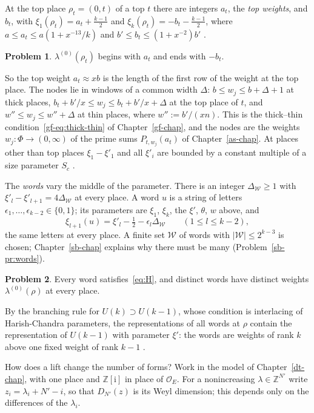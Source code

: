 \documentclass[reqno]{amsart}
\newcounter{chap}
\theoremstyle{definition}
\newtheorem{problem}{Problem}[section]
\theoremstyle{plain}
\theoremstyle{remark}
\newcommand{\Z}{\mathbb Z}
\newcommand{\Oc}{\mathcal O}
\newcommand{\Wc}{\mathcal W}
\begin{document}
At the top place \(\rho_t=(0,t)\) of a top \(t\) there are integers \(a_t\), the \emph{top weights}, and \(b_t\), with \(\xi_1(\rho_t)=a_t+\frac{k-1}2\) and \(\xi_k(\rho_t)=-b_t-\frac{k-1}2\), where \(a\le a_t\le a(1+x^{-13}/k)\) and \(b'\le b_t\le(1+x^{-2})b'\) \cite[Def.~18.5]{Adr}.

\begin{problem}\label{pr:top}
\(\lambda^{(0)}(\rho_t)\) begins with \(a_t\) and ends with \(-b_t\).
\end{problem}

So the top weight \(a_t\approx xb\) is the length of the first row of the weight at the top place.  The nodes lie in windows of a common width \(\Delta\): \(b\le w_j\le b+\Delta+1\) at thick places, \(b_t+b'/x\le w_j\le b_t+b'/x+\Delta\) at the top place of \(t\), and \(w''\le w_j\le w''+\Delta\) at thin places, where \(w'':=b'/(xn)\).  This is the thick--thin condition~\eqref{gf-eq:thick-thin} of Chapter~\ref{gf-chap}, and the nodes are the weights \(w_j\colon\Phi\to(0,\infty)\) of the prime sums \(P_{t,w_j}(a_t)\) of Chapter~\ref{as-chap}.  At places other than top places \(\xi_1-\xi'_1\) and all \(\xi'_i\) are bounded by a constant multiple of a size parameter \(S_c\) \cite[\S III.10, Hyp.~O24]{Rub}.

The \emph{words} vary the middle of the parameter.  There is an integer \(\Delta_\Wc\ge1\) with \(\xi'_l-\xi'_{l+1}=4\Delta_\Wc\) at every place.  A word \(u\) is a string of letters \(\epsilon_1,\dots,\epsilon_{k-2}\in\{0,1\}\); its parameters are \(\xi_1\), \(\xi_k\), the \(\xi'\), \(\theta\), \(w\) above, and
\[
 \xi_{l+1}(u)=\xi'_l-\tfrac12-\epsilon_l\Delta_\Wc\qquad(1\le l\le k-2),
\]
the same letters at every place.  A finite set \(\Wc\) of words with \(\lvert\Wc\rvert\le2^{k-3}\) is chosen; Chapter~\ref{sb-chap} explains why there must be many (Problem~\ref{sb-pr:words}).

\begin{problem}\label{pr:words}
Every word satisfies~\eqref{eq:H}, and distinct words have distinct weights \(\lambda^{(0)}(\rho)\) at every place.
\end{problem}

By the branching rule for \(U(k)\supset U(k-1)\), whose condition is interlacing of Harish-Chandra parameters, the representations of all words at \(\rho\) contain the representation of \(U(k-1)\) with parameter \(\xi'\): the words are weights of rank \(k\) above one fixed weight of rank \(k-1\) \cite[\S III.10, \S6]{Rub}.

How does a lift change the number of forms?  Work in the model of Chapter~\ref{dt-chap}, with one place and \(\Z[\mathrm i]\) in place of \(\Oc_E\).  For a nonincreasing \(\lambda\in\Z^{N'}\) write \(z_i=\lambda_i+N'-i\), so that \(D_{N'}(z)\) is its Weyl dimension; this depends only on the differences of the \(\lambda_i\).
\end{document}
